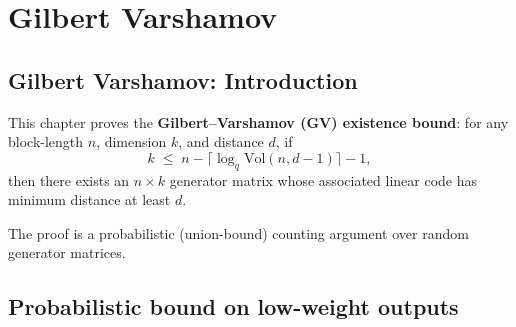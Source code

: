 \section{Gilbert Varshamov}
\subsection*{Gilbert Varshamov: Introduction}

This chapter proves the \textbf{Gilbert--Varshamov (GV) existence bound}:
for any block-length $n$, dimension $k$, and distance $d$, if
\[
k \;\le\; n - \lceil\log_q \mathrm{Vol}(n,d-1)\rceil - 1,
\]
then there exists an $n\times k$ generator matrix whose associated linear code has
minimum distance at least $d$.

The proof is a probabilistic (union-bound) counting argument over random generator matrices.

\subsection{Probabilistic bound on low-weight outputs}

